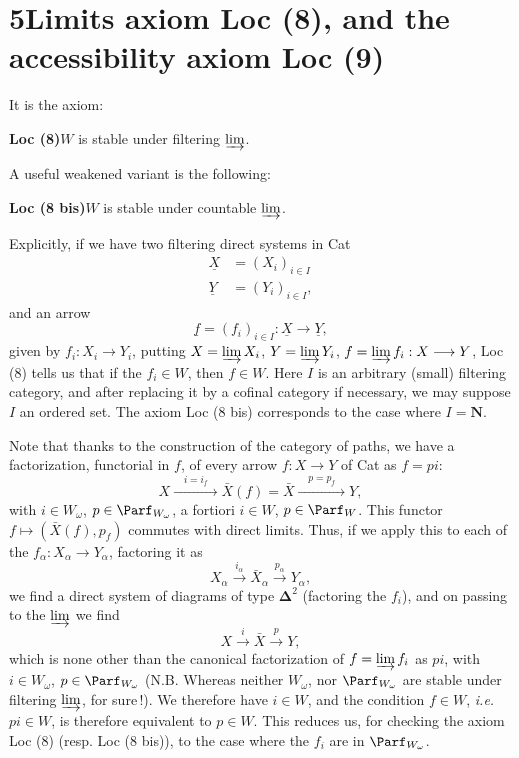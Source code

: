 

\section*{5\quad Limits axiom Loc (8), and the accessibility axiom Loc (9)}

It is the axiom:

\textbf{Loc (8)}\quad $W$ is stable under filtering $\varinjlim$.

A useful weakened variant is the following:

\textbf{Loc (8 bis)}\quad $W$ is stable under countable $\varinjlim$.

Explicitly, if we have two filtering direct systems in Cat
\[
\begin{aligned}
\underline{X} &= (X_i)_{i\in I}\\
\underline{Y} &= (Y_i)_{i\in I},
\end{aligned}
\]
and an arrow
\[
\underline{f} = (f_i)_{i\in I} : \underline{X} \longrightarrow \underline{Y},
\]
given by $f_i : X_i \longrightarrow Y_i$, putting $X = \varinjlim X_i$, $Y = \varinjlim Y_i$, $f = \varinjlim f_i : X \longrightarrow Y$, Loc (8) tells us that if the $f_i \in W$, then $f \in W$. Here $I$ is
an arbitrary (small) filtering category, and after replacing it by a cofinal category if necessary, we may suppose $I$ an ordered set. The axiom Loc (8 bis) corresponds to the case where $I = \mathbf{N}$.

Note that thanks to the construction of the category of paths, we have a factorization, functorial in $f$, of every arrow $f : X \longrightarrow Y$ of Cat as $f = pi$:
\[
X \xrightarrow{\quad i = i_f\quad} \bar{X}(f) = \bar{X} \xrightarrow{\quad p = p_f\quad} Y,
\]
with $i \in W_\omega$, $p \in \Parf_{W_\omega}$, a fortiori $i \in W$, $p \in \Parf_W$. This functor $f \longmapsto (\bar{X}(f), p_f)$ commutes with direct limits. Thus, if we apply this to each of the $f_\alpha : X_\alpha \longrightarrow Y_\alpha$, factoring it as
\[
X_\alpha \xrightarrow{i_\alpha} \bar{X}_\alpha \xrightarrow{p_\alpha} Y_\alpha,
\]
we find a direct system of diagrams of type $\boldsymbol{\Delta}^2$ (factoring the $f_i$), and on passing to the $\varinjlim$ we find
\[
X \xrightarrow{i} \bar{X} \xrightarrow{p} Y,
\]
which is none other than the canonical factorization
of $f = \varinjlim f_i$ as $pi$, with $i \in W_\omega$, $p \in \Parf_{W_\omega}$ (N.B. Whereas neither $W_\omega$, nor $\Parf_{W_\omega}$ are stable under filtering $\varinjlim$, for sure\,!). We therefore have $i \in W$, and the condition $f \in W$, \textit{i.e.} $pi \in W$, is therefore equivalent to $p \in W$. This reduces us, for checking the axiom Loc (8) (resp. Loc (8 bis)), to the case where the $f_i$ are in $\Parf_{W_\omega}$.


